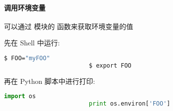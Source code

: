         \paragraph{调用环境变量 \\}
            \hspace*{2em} 可以通过  模块的  函数来获取环境变量的值

            \begin{Example}[调用环境变量]
                先在 Shell 中运行:
                    \begin{lstlisting}[language = {bash}, gobble = 24]
                        $ FOO="myFOO"
                        $ export FOO
                    \end{lstlisting}

                再在 Python 脚本中进行打印:
                    \begin{lstlisting}[language = {Python}, gobble = 24]
                        import os
                        print os.environ['FOO']
                    \end{lstlisting}
            \end{Example}
